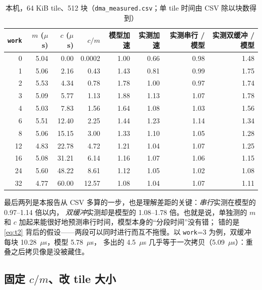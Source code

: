 \documentclass[11pt,a4paper]{ctexart}
\begin{document}
\begin{table}[H]
\centering\small
\caption{本机，64 KiB tile、512 块（\texttt{dma\_measured.csv}；单 tile 时间由 CSV 除以块数得到）}\label{tab:localsweep}
\begin{tabular}{rrrrrrrr}
\toprule
\texttt{work} & $m$ ($\mu$s) & $c$ ($\mu$s) & $c/m$ & 模型加速 & 实测加速 & 实测串行 / 模型 & 实测双缓冲 / 模型 \\
\midrule
0 & 5.04 & 0.00 & 0.0002 & 1.00 & 0.66 & 0.98 & 1.48 \\
1 & 5.06 & 2.16 & 0.43 & 1.43 & 0.81 & 0.99 & 1.75 \\
2 & 5.53 & 4.34 & 0.78 & 1.78 & 1.00 & 0.97 & 1.74 \\
3 & 5.09 & 5.77 & 1.13 & 1.88 & 1.13 & 1.07 & 1.78 \\
4 & 5.03 & 7.83 & 1.56 & 1.64 & 1.08 & 1.03 & 1.56 \\
6 & 5.51 & 12.40 & 2.25 & 1.44 & 1.23 & 1.14 & 1.34 \\
8 & 5.06 & 15.15 & 3.00 & 1.33 & 1.10 & 1.05 & 1.28 \\
12 & 4.83 & 22.78 & 4.72 & 1.21 & 1.04 & 1.07 & 1.25 \\
16 & 5.08 & 31.21 & 6.14 & 1.16 & 1.07 & 1.06 & 1.15 \\
24 & 5.60 & 48.22 & 8.61 & 1.12 & 1.05 & 1.02 & 1.08 \\
32 & 4.77 & 60.00 & 12.57 & 1.08 & 1.04 & 1.07 & 1.11 \\
\bottomrule
\end{tabular}
\end{table}

 最后两列是本报告从 CSV 多算的一步，也是理解差距的关键：\emph{串行}实测在模型的 0.97--1.14 倍以内，
\emph{双缓冲}实测却是模型的 1.08--1.78 倍。也就是说，单独测的 $m$ 和 $c$ 加起来能很好地预测串行时间，模型本身的“分段时间”没有错；
错的是 \cref{eq:t2} 背后的假设——两段可以同时进行而互不拖慢。以 \texttt{work}=3 为例，双缓冲每块 10.28~$\mu$s，模型 5.78~$\mu$s，
多出的 4.5~$\mu$s 几乎等于一次拷贝（5.09~$\mu$s）：重叠之后拷贝像是没被藏住。

\subsection{固定 $c/m$、改 tile 大小}
\end{document}
